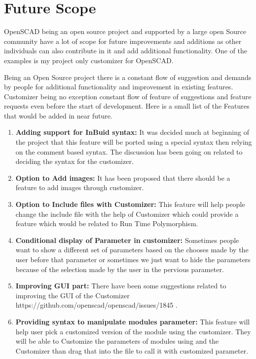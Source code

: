 \section{Future Scope}
OpenSCAD being an open source project and supported by a large open Source community have a lot of scope for future improvements and additions as other individuals can also contribute in it and add additional functionality. One of the examples is my project only customizer for OpenSCAD.

Being an Open Source project there is a constant flow of suggestion and demands by people for additional functionality and improvement in existing features.
Customizer being no exception constant flow of feature of suggestions and feature requests even before the start of development. Here is a small list of the Features that would be added in near future.

\begin{enumerate}

\item \textbf{Adding support for InBuid syntax:} It was decided much at beginning of the project that this feature will be ported using a special syntax then relying on the comment based syntax. The discussion has been going on related to deciding the syntax for the customizer.  

\item \textbf{Option to Add images:} It has been proposed that there should be a feature to add images through customizer.

\item \textbf{Option to Include files with Customizer:} This feature will help people change the include file with the help of Customizer which could provide a feature which would be related to Run Time Polymorphism.

\item \textbf{Conditional display of Parameter in customizer:} Sometimes people want to show a different set of parameters based on the chooses made by the user before that parameter or sometimes we just want to hide the parameters because of the selection made by the user in the pervious parameter.

\item \textbf{Improving GUI part:} There have been some suggestions related to improving the GUI of the Customizer
https://github.com/openscad/openscad/issues/1845 .
\item \textbf{Providing syntax to manipulate modules parameter:} This feature will help user pick a customized version of the module using the customizer. They will be able to Customize the parameters of modules using and the Customizer than drag that into the file to call it with customized parameter.
\end{enumerate}

